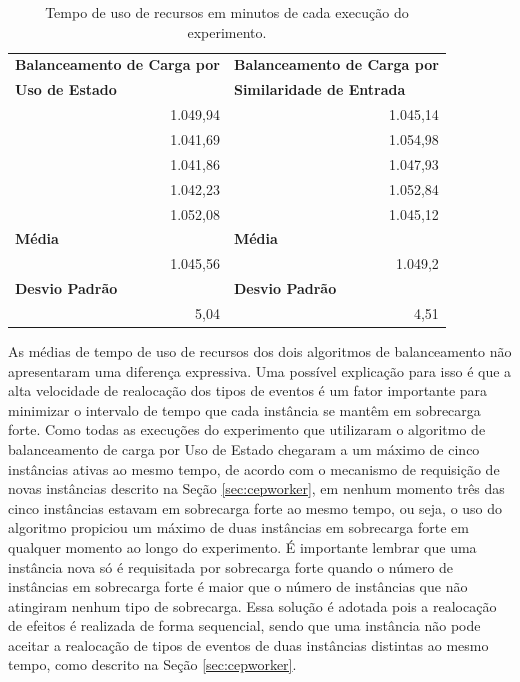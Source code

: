 
\begin{table}[h!]
\centering
\caption{Tempo de uso de recursos em minutos de cada execução do experimento.}
\begin{tabular}{rr}
\multicolumn{1}{l}{\textbf{Balanceamento de Carga por}} & \multicolumn{1}{l}{\textbf{Balanceamento de Carga por}}  \\
\multicolumn{1}{l}{\textbf{Uso de Estado}} & \multicolumn{1}{l}{\textbf{Similaridade de Entrada}}  \\
 1.049,94 & 1.045,14  \\
1.041,69  & 1.054,98 \\
1.041,86  & 1.047,93 \\
1.042,23  & 1.052,84  \\
1.052,08  & 1.045,12  \\
\multicolumn{1}{l}{\textbf{Média}}& \multicolumn{1}{l}{\textbf{Média}} \\
1.045,56  & 1.049,2  \\
\multicolumn{1}{l}{\textbf{Desvio Padrão}} & \multicolumn{1}{l}{\textbf{Desvio Padrão}}  \\
 5,04 & 4,51                         
\end{tabular}
\label{Tab:time_and_avg}
\end{table}

As médias de tempo de uso de recursos dos dois algoritmos de balanceamento não apresentaram uma diferença expressiva.
Uma possível explicação para isso é que a alta velocidade de realocação dos tipos de eventos é um fator importante para minimizar o intervalo de tempo que cada instância se mantêm em sobrecarga forte. Como todas as execuções do experimento que utilizaram o algoritmo de balanceamento de carga por Uso de Estado chegaram a um máximo de cinco instâncias ativas ao mesmo tempo, de acordo com o mecanismo de requisição de novas instâncias descrito na Seção \ref{sec:cepworker}, em nenhum momento três das cinco instâncias estavam em sobrecarga forte ao mesmo tempo, ou seja, o uso do algoritmo propiciou um máximo de duas instâncias em sobrecarga forte em qualquer momento ao longo do experimento. É importante lembrar que uma instância nova só é requisitada por sobrecarga forte quando o número de instâncias em sobrecarga forte é maior que o número de instâncias que não atingiram nenhum tipo de sobrecarga. Essa solução é adotada pois a realocação de efeitos é realizada de forma sequencial, sendo que uma instância não pode aceitar a realocação de tipos de eventos de duas instâncias distintas ao mesmo tempo, como descrito na Seção \ref{sec:cepworker}.

